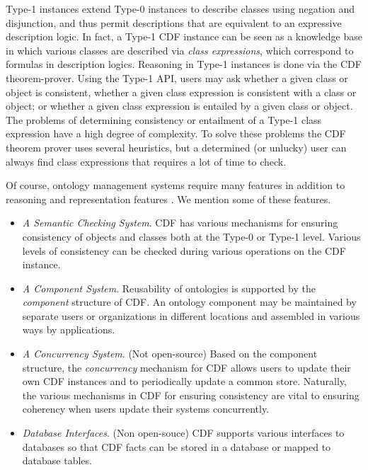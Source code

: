 Type-1 instances extend Type-0 instances to describe classes using
negation and disjunction, and thus permit descriptions that are
equivalent to an expressive description logic.  In fact, a Type-1 CDF
instance can be seen as a knowledge base in which various classes are
described via {\em class expressions}, which correspond to formulas in
description logics.  Reasoning in Type-1 instances is done via the CDF
theorem-prover.  Using the Type-1 API, users may ask whether a given
class or object is consistent, whether a given class expression is
consistent with a class or object; or whether a given class expression
is entailed by a given class or object.  The problems of determining
consistency or entailment of a Type-1 class expression have a high
degree of complexity.  To solve these problems the CDF theorem prover
uses several heuristics, but a determined (or unlucky) user can always
find class expressions that requires a lot of time to check.

Of course, ontology management systems require many features in
addition to reasoning and representation features \cite{MGPS03}.  We
mention some of these features.

\begin{itemize}
\item {\em A Semantic Checking System}.  CDF has various mechanisms for
ensuring consistency of objects and classes both at the Type-0 or
Type-1 level.  Various levels of consistency can be checked during
various operations on the CDF instance.
%
\item {\em A Component System}. Reusability of ontologies is supported
by the {\em component} structure of CDF.  An ontology component may be
maintained by separate users or organizations in different locations
and assembled in various ways by applications.
%
\item {\em A Concurrency System}. (Not open-source) Based on the
component structure, the {\em concurrency} mechanism for CDF allows
users to update their own CDF instances and to periodically update a
common store. Naturally, the various mechanisms in CDF for ensuring
consistency are vital to ensuring coherency when users update
their systems concurrently.
%
\item {\em Database Interfaces}. (Non open-souce) CDF supports various
interfaces to databases so that CDF facts can be stored in a database
or mapped to database tables.
\end{itemize}

